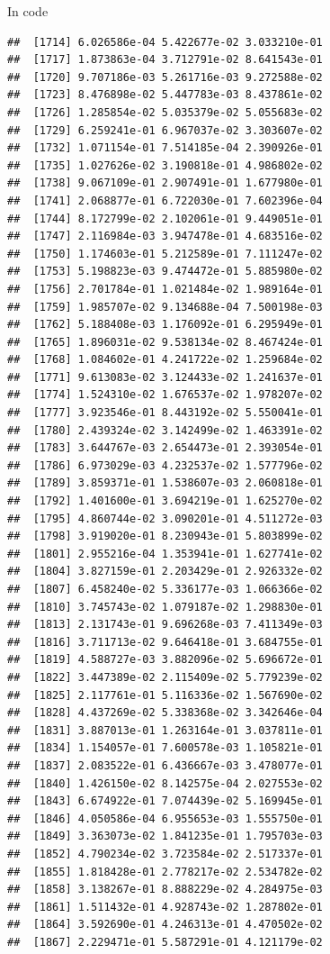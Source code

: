 \documentclass[ignorenonframetext,]{beamer}
\begin{document}
\begin{frame}[fragile]{In code}
\begin{verbatim}
##  [1714] 6.026586e-04 5.422677e-02 3.033210e-01
##  [1717] 1.873863e-04 3.712791e-02 8.641543e-01
##  [1720] 9.707186e-03 5.261716e-03 9.272588e-02
##  [1723] 8.476898e-02 5.447783e-03 8.437861e-02
##  [1726] 1.285854e-02 5.035379e-02 5.055683e-02
##  [1729] 6.259241e-01 6.967037e-02 3.303607e-02
##  [1732] 1.071154e-01 7.514185e-04 2.390926e-01
##  [1735] 1.027626e-02 3.190818e-01 4.986802e-02
##  [1738] 9.067109e-01 2.907491e-01 1.677980e-01
##  [1741] 2.068877e-01 6.722030e-01 7.602396e-04
##  [1744] 8.172799e-02 2.102061e-01 9.449051e-01
##  [1747] 2.116984e-03 3.947478e-01 4.683516e-02
##  [1750] 1.174603e-01 5.212589e-01 7.111247e-02
##  [1753] 5.198823e-03 9.474472e-01 5.885980e-02
##  [1756] 2.701784e-01 1.021484e-02 1.989164e-01
##  [1759] 1.985707e-02 9.134688e-04 7.500198e-03
##  [1762] 5.188408e-03 1.176092e-01 6.295949e-01
##  [1765] 1.896031e-02 9.538134e-02 8.467424e-01
##  [1768] 1.084602e-01 4.241722e-02 1.259684e-02
##  [1771] 9.613083e-02 3.124433e-02 1.241637e-01
##  [1774] 1.524310e-02 1.676537e-02 1.978207e-02
##  [1777] 3.923546e-01 8.443192e-02 5.550041e-01
##  [1780] 2.439324e-02 3.142499e-02 1.463391e-02
##  [1783] 3.644767e-03 2.654473e-01 2.393054e-01
##  [1786] 6.973029e-03 4.232537e-02 1.577796e-02
##  [1789] 3.859371e-01 1.538607e-03 2.060818e-01
##  [1792] 1.401600e-01 3.694219e-01 1.625270e-02
##  [1795] 4.860744e-02 3.090201e-01 4.511272e-03
##  [1798] 3.919020e-01 8.230943e-01 5.803899e-02
##  [1801] 2.955216e-04 1.353941e-01 1.627741e-02
##  [1804] 3.827159e-01 2.203429e-01 2.926332e-02
##  [1807] 6.458240e-02 5.336177e-03 1.066366e-02
##  [1810] 3.745743e-02 1.079187e-02 1.298830e-01
##  [1813] 2.131743e-01 9.696268e-03 7.411349e-03
##  [1816] 3.711713e-02 9.646418e-01 3.684755e-01
##  [1819] 4.588727e-03 3.882096e-02 5.696672e-01
##  [1822] 3.447389e-02 2.115409e-02 5.779239e-02
##  [1825] 2.117761e-01 5.116336e-02 1.567690e-02
##  [1828] 4.437269e-02 5.338368e-02 3.342646e-04
##  [1831] 3.887013e-01 1.263164e-01 3.037811e-01
##  [1834] 1.154057e-01 7.600578e-03 1.105821e-01
##  [1837] 2.083522e-01 6.436667e-03 3.478077e-01
##  [1840] 1.426150e-02 8.142575e-04 2.027553e-02
##  [1843] 6.674922e-01 7.074439e-02 5.169945e-01
##  [1846] 4.050586e-04 6.955653e-03 1.555750e-01
##  [1849] 3.363073e-02 1.841235e-01 1.795703e-03
##  [1852] 4.790234e-02 3.723584e-02 2.517337e-01
##  [1855] 1.818428e-01 2.778217e-02 2.534782e-02
##  [1858] 3.138267e-01 8.888229e-02 4.284975e-03
##  [1861] 1.511432e-01 4.928743e-02 1.287802e-01
##  [1864] 3.592690e-01 4.246313e-01 4.470502e-02
##  [1867] 2.229471e-01 5.587291e-01 4.121179e-02

\end{verbatim}
\end{frame}
\end{document}
